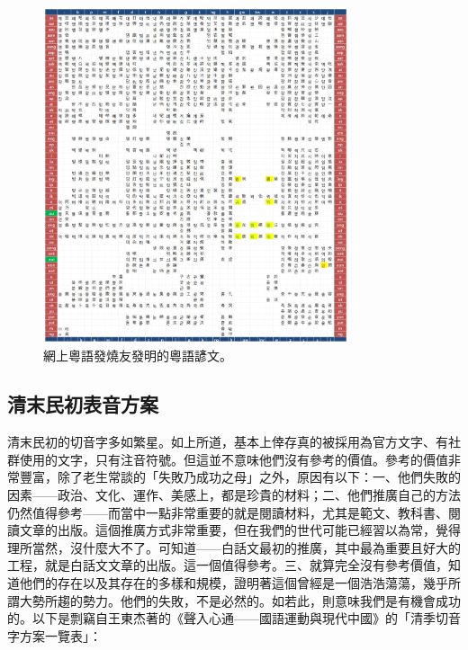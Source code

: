 \documentclass[a5paper, 12pt, openany]{book} %
\begin{document}
\begin{figure}[H]
  \centering
  \includegraphics[width=0.8\textwidth]{./images/cantonese_hangul.png}
  \caption{網上粵語發燒友發明的粵語諺文。}
  \label{fig:cantonese_hangul}
\end{figure}

\subsection{清末民初表音方案}

清末民初的切音字多如繁星。如上所道，基本上倖存真的被採用為官方文字、有社群使用的文字，只有注音符號。但這並不意味他們沒有參考的價值。參考的價值非常豐富，除了老生常談的「失敗乃成功之母」之外，原因有以下：一、他們失敗的因素——政治、文化、運作、美感上，都是珍貴的材料；二、他們推廣自己的方法仍然值得參考——而當中一點非常重要的就是閱讀材料，尤其是範文、教科書、閱讀文章的出版。這個推廣方式非常重要，但在我們的世代可能已經習以為常，覺得理所當然，沒什麼大不了。可知道——白話文最初的推廣，其中最為重要且好大的工程，就是白話文文章的出版。這一個值得參考。三、就算完全沒有參考價值，知道他們的存在以及其存在的多樣和規模，證明著這個曾經是一個浩浩蕩蕩，幾乎所謂大勢所趨的勢力。他們的失敗，不是必然的。如若此，則意味我們是有機會成功的。以下是剽竊自王東杰著的《聲入心通——國語運動與現代中國》的「清季切音字方案一覽表」：
\end{document}
